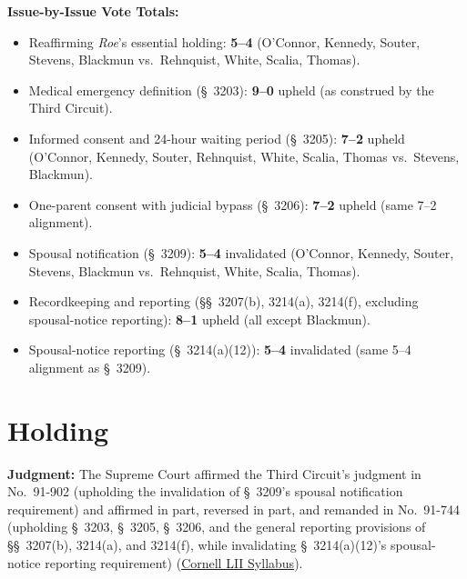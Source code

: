 \documentclass[12pt]{article}
\begin{document}
\noindent \textbf{Issue-by-Issue Vote Totals:}
\begin{itemize}
\item Reaffirming \textit{Roe}'s essential holding: \textbf{5--4} (O'Connor, Kennedy, Souter, Stevens, Blackmun vs.\ Rehnquist, White, Scalia, Thomas).
\item Medical emergency definition (\S\ 3203): \textbf{9--0} upheld (as construed by the Third Circuit).
\item Informed consent and 24-hour waiting period (\S\ 3205): \textbf{7--2} upheld (O'Connor, Kennedy, Souter, Rehnquist, White, Scalia, Thomas vs.\ Stevens, Blackmun).
\item One-parent consent with judicial bypass (\S\ 3206): \textbf{7--2} upheld (same 7--2 alignment).
\item Spousal notification (\S\ 3209): \textbf{5--4} invalidated (O'Connor, Kennedy, Souter, Stevens, Blackmun vs.\ Rehnquist, White, Scalia, Thomas).
\item Recordkeeping and reporting (\S\S\ 3207(b), 3214(a), 3214(f), excluding spousal-notice reporting): \textbf{8--1} upheld (all except Blackmun).
\item Spousal-notice reporting (\S\ 3214(a)(12)): \textbf{5--4} invalidated (same 5--4 alignment as \S\ 3209).
\end{itemize}

\section{Holding}

\textbf{Judgment:} The Supreme Court affirmed the Third Circuit's judgment in No.\ 91-902 (upholding the invalidation of \S\ 3209's spousal notification requirement) and affirmed in part, reversed in part, and remanded in No.\ 91-744 (upholding \S\ 3203, \S\ 3205, \S\ 3206, and the general reporting provisions of \S\S\ 3207(b), 3214(a), and 3214(f), while invalidating \S\ 3214(a)(12)'s spousal-notice reporting requirement) (\href{https://www.law.cornell.edu/supct/html/91-744.ZS.html}{Cornell LII Syllabus}).
\end{document}
